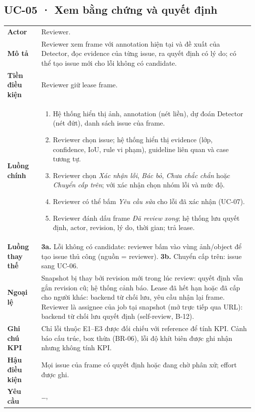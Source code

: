 \subsection*{UC-05 · Xem bằng chứng và quyết định}
\begin{xltabular}{\linewidth}{@{}>{\bfseries}L{3.2cm}Y@{}}
\toprule
Actor & Reviewer.\\
Mô tả & Reviewer xem frame với annotation hiện tại và đề xuất của Detector, đọc evidence của từng issue, ra quyết định có lý do; có thể tạo issue mới cho lỗi không có candidate.\\
Tiền điều kiện & Reviewer giữ lease frame.\\
Luồng chính &
\begin{enumerate}[nosep]
  \item Hệ thống hiển thị ảnh, annotation (nét liền), dự đoán Detector (nét đứt), danh sách issue của frame.
  \item Reviewer chọn issue; hệ thống hiển thị evidence (lớp, confidence, IoU, rule vi phạm), guideline liên quan và case tương tự.
  \item Reviewer chọn \emph{Xác nhận lỗi}, \emph{Bác bỏ}, \emph{Chưa chắc chắn} hoặc \emph{Chuyển cấp trên}; với xác nhận chọn nhóm lỗi và mức độ.
  \item Reviewer có thể bấm \emph{Yêu cầu sửa} cho lỗi đã xác nhận (UC-07).
  \item Reviewer đánh dấu frame \emph{Đã review xong}; hệ thống lưu quyết định, actor, revision, lý do, thời gian; trả lease.
\end{enumerate}\\
Luồng thay thế & \textbf{3a.} Lỗi không có candidate: reviewer bấm vào vùng ảnh/object để tạo issue thủ công (nguồn = reviewer).\newline
\textbf{3b.} Chuyển cấp trên: issue sang UC-06.\\
Ngoại lệ & Snapshot bị thay bởi revision mới trong lúc review: quyết định vẫn gắn revision cũ; hệ thống cảnh báo.\newline
Lease đã hết hạn hoặc đã cấp cho người khác: backend từ chối lưu, yêu cầu nhận lại frame.\newline
Reviewer là assignee của job tại snapshot (mở trực tiếp qua URL): backend từ chối lưu quyết định (self-review, B-12).\\
Ghi chú KPI & Chỉ lỗi thuộc E1–E3 được đối chiếu với reference để tính KPI. Cảnh báo cấu trúc, box thừa (BR-06), lỗi độ khít biên được ghi nhận nhưng không tính KPI.\\
Hậu điều kiện & Mọi issue của frame có quyết định hoặc đang chờ phân xử; effort được ghi.\\
Yêu cầu & …, \\
\bottomrule
\end{xltabular}


